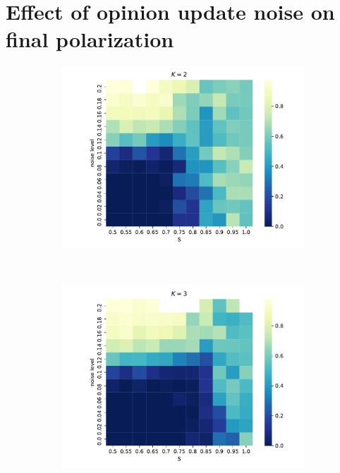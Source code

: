 \documentclass[11pt,letterpaper]{article}
\begin{document}
\section{Effect of opinion update noise on final polarization}

\begin{figure}[t!]
  \centering
      \begin{subfigure}[t]{0.49\textwidth}
          \centering
          \includegraphics[width=\textwidth]{Figures/p_v_noise_k=2.pdf}
          \caption{}
      \end{subfigure}
      ~
      \begin{subfigure}[t]{0.49\textwidth}
          \centering
          \includegraphics[width=\textwidth]{Figures/p_v_noise_k=3.pdf}

\end{subfigure}
\end{figure}
\end{document}
